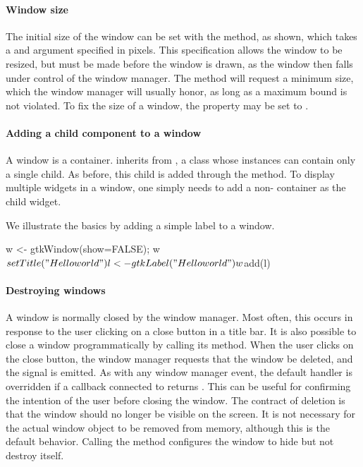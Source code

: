 \paragraph{Window size}
The initial size of the window can be set with the
 method, as shown, which takes a
 and  argument
specified in pixels. This specification allows the window to be
resized, but must be made before the window is drawn, as the window
then falls under control of the window manager. The
 method will request a minimum size,
which the window manager will usually honor, as long as a maximum
bound is not violated. To fix the size of a window, the
 property may be set to .

\paragraph{Adding a child component to a window}
A window is a container.  inherits from
, a class whose instances can contain only a single child. As
before, this child is added through the 
method. To display multiple widgets in a window, one simply needs to
add a non- container as the child widget.

We illustrate the basics by adding a simple label to a window.
\begin{Schunk}
\begin{Sinput}
 w <- gtkWindow(show=FALSE); w$setTitle("Hello world")
 l <- gtkLabel("Hello world")
 w$add(l)
\end{Sinput}
\end{Schunk}
%

\paragraph{Destroying windows}
A window is normally closed by the window manager. Most often, this
occurs in response to the user clicking on a close button in a title
bar. It is also possible to close a window programmatically by calling
its  method. When the user clicks on the
close button, the window manager requests that the window be deleted,
and the  signal is emitted. As with any window
manager event, the default handler is overridden if a callback
connected to  returns .  This can be
useful for confirming the intention of the user before closing the
window. The contract of deletion is that the window should no longer
be visible on the screen. It is not necessary for the actual window
object to be removed from memory, although this is the default
behavior. Calling the  method configures the window
to hide but not destroy itself.

